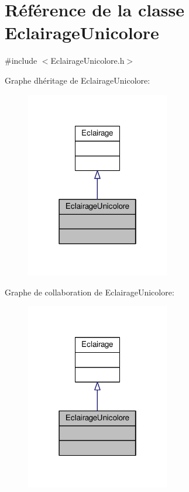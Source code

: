 \hypertarget{classEclairageUnicolore}{}\section{Référence de la classe Eclairage\+Unicolore}
\label{classEclairageUnicolore}


{\ttfamily \#include $<$Eclairage\+Unicolore.\+h$>$}



Graphe d\textquotesingle{}héritage de Eclairage\+Unicolore\+:\nopagebreak
\begin{figure}[H]
\begin{center}
\leavevmode
\includegraphics[width=178pt]{classEclairageUnicolore__inherit__graph}
\end{center}
\end{figure}


Graphe de collaboration de Eclairage\+Unicolore\+:\nopagebreak
\begin{figure}[H]
\begin{center}
\leavevmode
\includegraphics[width=178pt]{classEclairageUnicolore__coll__graph}
\end{center}
\end{figure}

